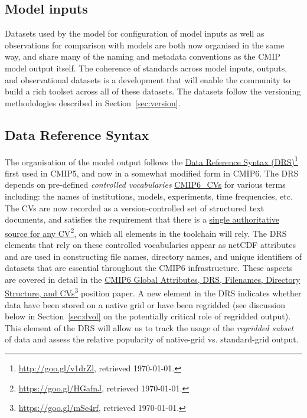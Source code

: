 \documentclass[gmd,manuscript]{copernicus}
\newcommand{\urlref}[2] {\href{#1}{#2}\footnote{\url{#1}, retrieved \today.}}
\begin{document}
\subsection{Model inputs}
\label{sec:data-inputs}

Datasets used by the model for configuration of model inputs
\citep[\texttt{Input Datasets for Model Intercomparison Projects) input4MIPs}, see][]{ref:duracketal2018} as well as
observations for comparison with models \citep[\texttt{Observations for Model Intercomparison Projects) obs4MIPs},
see][]{ref:teixeiraetal2014,ref:ferraroetal2015} are both now
organised in the same way, and share many of the naming and metadata
conventions as the CMIP model output itself.
The coherence of standards across model inputs, outputs, and
observational datasets is a development that will enable the community
to build a rich toolset across all of these datasets. The datasets
follow the versioning methodologies described in Section~\ref{sec:version}.

\subsection{Data Reference Syntax}
\label{sec:data-drs}

The organisation of the model output follows the
\urlref{http://goo.gl/v1drZl}{Data Reference Syntax (DRS)} first used
in CMIP5, and now in a somewhat modified form in CMIP6. The DRS depends
on pre-defined \emph{controlled vocabularies}
\hyperlink{https://github.com/WCRP-CMIP/CMIP6_CVs}{CMIP6\_CVs}
for various terms
including: the names of institutions, models, experiments, time
frequencies, etc. The CVs are now recorded as a version-controlled set
of structured text documents, and satisfies the requirement that there
is a \urlref{https://goo.gl/HGafnJ}{single authoritative source for
  any CV}, on which all elements in the toolchain will rely. The DRS
elements that rely on these controlled vocabularies appear as netCDF
attributes and are used in constructing file names, directory names,
and unique identifiers of datasets that are essential throughout the
CMIP6 infrastructure. These aspects are covered in detail in the
\urlref{https://goo.gl/mSe4rf}{CMIP6 Global Attributes, DRS,
  Filenames, Directory Structure, and CVs} position paper. A new
element in the DRS indicates whether data have been stored on a native
grid or have been regridded (see discussion below in
Section~\ref{sec:dvol} on the potentially critical role of regridded
output). This element of the DRS will allow us to track the usage of
the \emph{regridded subset} of data and assess the relative
popularity of native-grid vs. standard-grid output.
\end{document}
